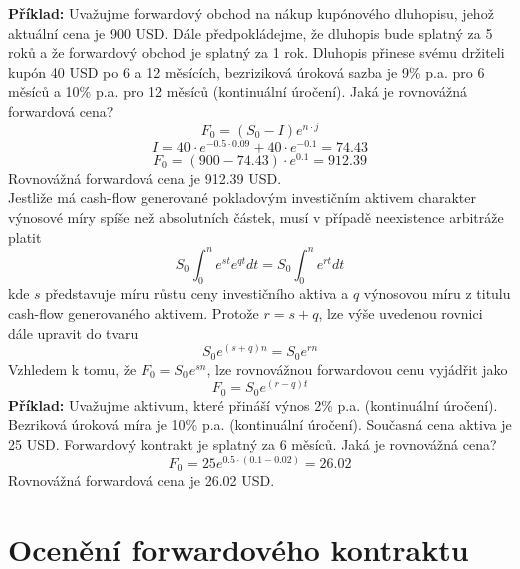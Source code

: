 \documentclass[a4paper]{book}
\begin{document}
\noindent \textbf{Příklad:} Uvažujme forwardový obchod na nákup kupónového dluhopisu, jehož aktuální cena je 900 USD. Dále předpokládejme, že dluhopis bude splatný za 5 roků a že forwardový obchod je splatný za 1 rok. Dluhopis přinese svému držiteli kupón 40 USD po 6 a 12 měsících, bezriziková úroková sazba je 9\% p.a. pro 6 měsíců a 10\% p.a. pro 12 měsíců (kontinuální úročení). Jaká je rovnovážná forwardová cena?
\begin{equation*}
F_0 = (S_0 - I)e^{n \cdot j}
\end{equation*}
\begin{equation*}
I = 40 \cdot e^{-0.5 \cdot 0.09} + 40 \cdot e^{-0.1} = 74.43
\end{equation*}
\begin{equation*}
F_0 = (900 - 74.43) \cdot e^{0.1} = 912.39
\end{equation*}
Rovnovážná forwardová cena je 912.39 USD.\\

Jestliže má cash-flow generované pokladovým investičním aktivem charakter výnosové míry spíše než absolutních částek, musí v případě neexistence arbitráže platit
\begin{equation*}
S_0 \int^n_0 e^{st} e^{qt} dt = S_0 \int^n_0 e^{rt}dt 
\end{equation*}
kde $s$ představuje míru růstu ceny investičního aktiva a $q$ výnosovou míru z titulu cash-flow generovaného aktivem. Protože $r = s + q$, lze výše uvedenou rovnici dále upravit do tvaru
\begin{equation*}
S_0e^{(s + q)n} = S_0e^{rn} 
\end{equation*}
Vzhledem k tomu, že $F_0 = S_0e^{sn}$, lze rovnovážnou forwardovou cenu vyjádřit jako
\begin{equation*}
F_0 = S_0e^{(r - q)t} 
\end{equation*}
\noindent \textbf{Příklad:} Uvažujme aktivum, které přináší výnos 2\% p.a. (kontinuální úročení). Bezriková úroková míra je 10\% p.a. (kontinuální úročení). Současná cena aktiva je 25 USD. Forwardový kontrakt je splatný za 6 měsíců. Jaká je rovnovážná cena?
\begin{equation*}
F_0 = 25e^{0.5 \cdot (0.1 - 0.02)} = 26.02
\end{equation*}
Rovnovážná forwardová cena je 26.02 USD.

\section{Ocenění forwardového kontraktu}
\end{document}
